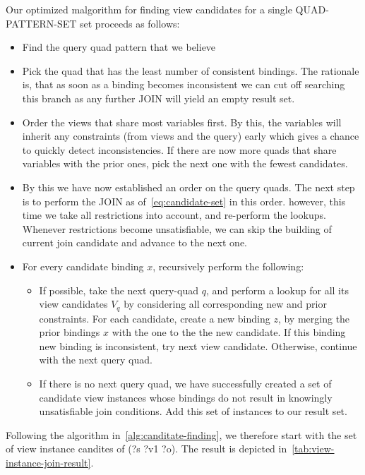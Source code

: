 \documentclass[a4paper,twoside,bibtotoc,abstracton,12pt,BCOR=15mm]{scrreprt}
\begin{document}
Our optimized malgorithm for finding view candidates for a single QUAD-PATTERN-SET set proceeds as follows:

\begin{itemize}
  \item  Find the query quad pattern that we believe 
  \item Pick the quad that has the least number of consistent bindings.
  The rationale is, that as soon as a binding becomes inconsistent we can cut off searching this branch as any further JOIN will yield an empty result set. 
  \item Order the views that share most variables first. By this, the variables will inherit any constraints (from views and the query) early which gives a chance to quickly detect inconsistencies.
  If there are now more quads that share variables with the prior ones, pick the next one with the fewest candidates.
  \item By this we have now established an order on the query quads. The next step is to perform the JOIN as of~\autoref{eq:candidate-set} in this order. 
  however, this time we take all restrictions into account, and re-perform the lookups.
  Whenever restrictions become unsatisfiable, we can skip the building of current join candidate and advance to the next one.
  \item For every candidate binding $x$, recursively perform the following:
  \begin{itemize}
    \item If possible, take the next query-quad $q$, and perform a lookup for all its view candidates $V_q$ by considering all corresponding new and prior constraints.
    For each candidate, create a new binding $z$, by merging the prior bindings $x$ with the one to the the new candidate.
    If this binding new binding is inconsistent, try next view candidate.
	Otherwise, continue with the next query quad.
  \item If there is no next query quad, we have successfully created a set of candidate view instances whose bindings do not result in
	knowingly unsatisfiable join conditions. Add this set of instances to our result set.
  \end{itemize}
\end{itemize}

Following the algorithm in~\autoref{alg:canditate-finding}, we therefore start with the set of view instance candites of (?s ?v1 ?o).
The result is depicted in~\autoref{tab:view-instance-join-result}. 
\end{document}
